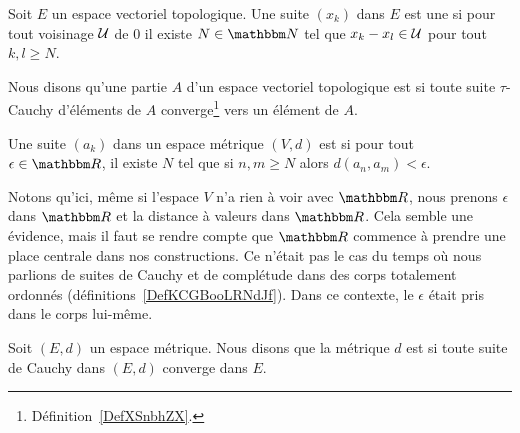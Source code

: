 \begin{definition}   \label{DefZSnlbPc}
    Soit \( E\) un espace vectoriel topologique. Une suite \( (x_k)\) dans \( E\) est une  si pour tout voisinage \( \mathcal{U}\) de \( 0\) il existe \( N\in \eN\) tel que \( x_k-x_l\in\mathcal{U}\) pour tout \( k,l\geq N\).
\end{definition}

\begin{definition}      \label{DEFooVQDBooNxprFU}
    Nous disons qu'une partie \( A\) d'un espace vectoriel topologique est  si toute suite \(  \tau\)-Cauchy d'éléments de \( A\) converge\footnote{Définition~\ref{DefXSnbhZX}.} vers un élément de \( A\).
\end{definition}

\begin{definition}      \label{DEFooXOYSooSPTRTn}
    Une suite \( (a_k)\) dans un espace métrique \( (V,d)\) est  si pour tout \( \epsilon\in \eR\), il existe \( N\) tel que si \( n,m\geq N\) alors \( d(a_n,a_m)<\epsilon\).
\end{definition}

Notons qu'ici, même si l'espace \( V\) n'a rien à voir avec \( \eR\), nous prenons \( \epsilon\) dans \( \eR\) et la distance à valeurs dans \( \eR\). Cela semble une évidence, mais il faut se rendre compte que \( \eR\) commence à prendre une place centrale dans nos constructions. Ce n'était pas le cas du temps où nous parlions de suites de Cauchy et de complétude dans des corps totalement ordonnés (définitions~\ref{DefKCGBooLRNdJf}). Dans ce contexte, le \( \epsilon\) était pris dans le corps lui-même.

\begin{definition}       \label{DEFooHBAVooKmqerL}
    Soit \( (E,d)\) un espace métrique. Nous disons que la métrique \( d\) est  si toute suite de Cauchy dans \( (E,d)\) converge dans \( E\).
\end{definition}

